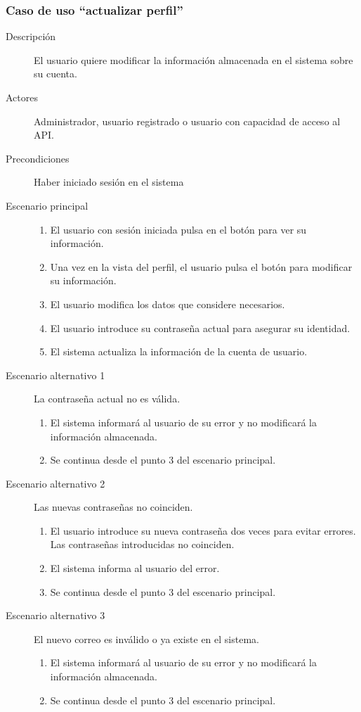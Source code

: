 \subsubsection{Caso de uso ``actualizar perfil''}
\begin{description}
\item[Descripción] 			El usuario quiere modificar la información almacenada en el sistema sobre su cuenta.
\item[Actores] 				Administrador, usuario registrado o usuario con capacidad de acceso al API.
\item[Precondiciones]  		Haber iniciado sesión en el sistema
\item[Escenario principal] 	\hfill
						 	\begin{enumerate}
							\item El usuario con sesión iniciada pulsa en el botón para ver su información.
							\item Una vez en la vista del perfil, el usuario pulsa el botón para modificar su información.
							\item El usuario modifica los datos que considere necesarios.
							\item El usuario introduce su contraseña actual para asegurar su identidad.
							\item El sistema actualiza la información de la cuenta de usuario.
							\end{enumerate}
\item[Escenario alternativo 1] La contraseña actual no es válida.
							\begin{enumerate}
							\item El sistema informará al usuario de su error y no modificará la información almacenada.
							\item Se continua desde el punto 3 del escenario principal.
							\end{enumerate}
\item [Escenario alternativo 2] Las nuevas contraseñas no coinciden.
							\begin{enumerate}
							\item El usuario introduce su nueva contraseña dos veces para evitar errores. Las contraseñas introducidas no coinciden.
							\item El sistema informa al usuario del error.
							\item Se continua desde el punto 3 del escenario principal.
							\end{enumerate}							
\item[Escenario alternativo 3] El nuevo correo es inválido o ya existe en el sistema.
							\begin{enumerate}
							\item El sistema informará al usuario de su error y no modificará la información almacenada.
							\item Se continua desde el punto 3 del escenario principal.
							\end{enumerate}							
\end{description}